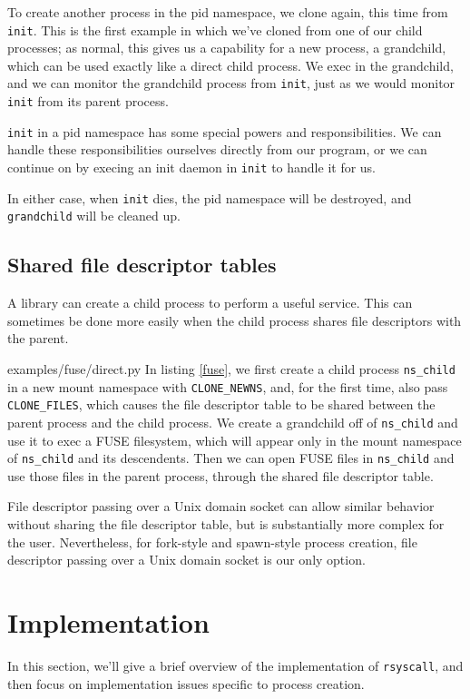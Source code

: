 \documentclass[letterpaper,twocolumn,10pt]{article}
\begin{document}
To create another process in the pid namespace,
we clone again, this time from \texttt{init}.
This is the first example in which we've cloned from one of our child processes;
as normal, this gives us a capability for a new process, a grandchild,
which can be used exactly like a direct child process.
We exec in the grandchild,
and we can monitor the grandchild process from \texttt{init},
just as we would monitor \texttt{init} from its parent process.

\texttt{init} in a pid namespace has some special powers and responsibilities.
We can handle these responsibilities ourselves directly from our program,
or we can continue on by execing an init daemon in \texttt{init} to handle it for us.

In either case, when \texttt{init} dies,
the pid namespace will be destroyed,
and \texttt{grandchild} will be cleaned up.
\subsection{Shared file descriptor tables}\label{shared_fd_table}
A library can create a child process to perform a useful service.
This can sometimes be done more easily when the child process shares file descriptors with the parent.


{examples/fuse/direct.py}
In listing \ref{fuse},
we first create a child process \verb|ns_child| in a new mount namespace with \verb|CLONE_NEWNS|,
and, for the first time, also pass \verb|CLONE_FILES|,
which causes the file descriptor table to be shared between the parent process and the child process.
We create a grandchild off of \verb|ns_child|
and use it to exec a FUSE filesystem,
which will appear only in the mount namespace of \verb|ns_child| and its descendents.
Then we can open FUSE files in \verb|ns_child|
and use those files in the parent process,
through the shared file descriptor table.

File descriptor passing over a Unix domain socket
can allow similar behavior without sharing the file descriptor table,
but is substantially more complex for the user.
Nevertheless, for fork-style and spawn-style process creation,
file descriptor passing over a Unix domain socket
is our only option.
\section{Implementation}\label{implementation}
In this section, we'll give a brief overview of the implementation of \texttt{rsyscall},
and then focus on implementation issues specific to process creation.
\end{document}
